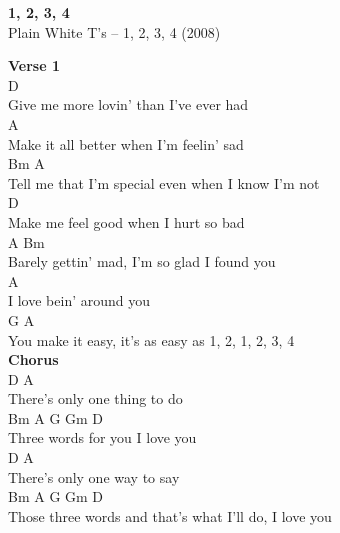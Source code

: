 \documentclass[a4paper]{article}
\begin{document}
    \begin{center}
        \textbf{1, 2, 3, 4}
        ~\\
        Plain White T's -- 1, 2, 3, 4 (2008)
    \end{center}
    {
        \scriptsize
        \textbf{Verse 1}
        ~\\
        {
            \cutive
            \obeyspaces
D
\\
Give me more lovin' than I've ever had
\\
A
\\
Make it all better when I'm feelin' sad
\\
Bm                                         A
\\
Tell me that I'm special even when I know I'm not
\\
D
\\
Make me feel good when I hurt so bad
\\
A                                      Bm
\\
Barely gettin' mad, I'm so glad I found you
\\
                A
\\
I love bein' around you
\\
             G                  A
\\
You make it easy, it's as easy as 1, 2, 1, 2, 3, 4
\\

        }
        \textbf{Chorus}
        ~\\
        {
            \cutive
            \obeyspaces
             D        A
\\
There's only one thing to do
\\
  Bm         A    G  Gm  D
\\
Three words for you I love you
\\
             D        A
\\
There's only one way to say
\\
      Bm               A                G Gm D
\\
Those three words and that's what I'll do, I love you
\\

}}
\end{document}
